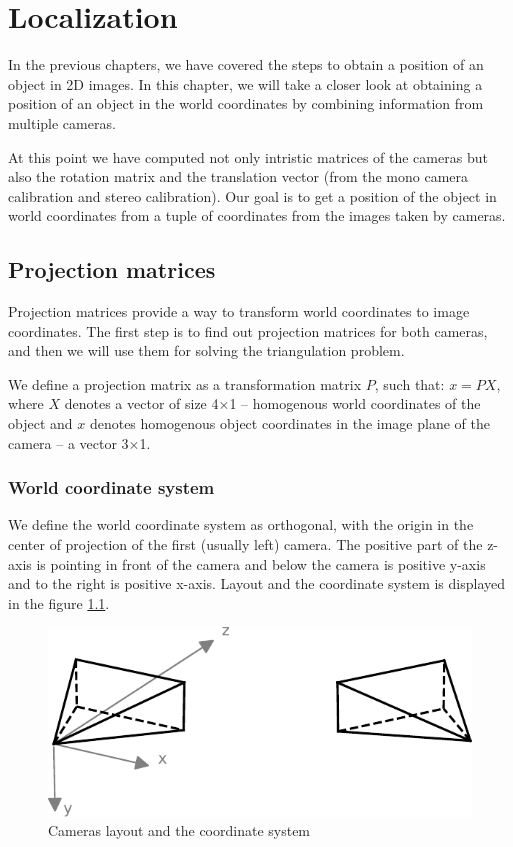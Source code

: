 \chapter{Localization}

In the previous chapters, we have covered the steps to obtain a position of
an object in 2D images. In this chapter, we will take a closer look at
obtaining a position of an object in the world coordinates by combining
information from multiple cameras.

At this point we have computed not only intristic matrices of the cameras but
also the rotation matrix and the translation vector (from the mono camera
calibration and stereo calibration). Our goal is to get a position of the
object in world coordinates from a tuple of coordinates from the images taken by
cameras.

\section{Projection matrices}
Projection matrices provide a way to transform world coordinates to image
coordinates. The first step is to find out projection matrices for both
cameras, and then we will use them for solving the triangulation problem.

We define a projection matrix as a transformation matrix $P$, such that: $x = P
 X$, where $X$ denotes a vector of size 4$\times$1 -- homogenous world coordinates
of the object and $x$ denotes homogenous object coordinates in the image plane
of the camera -- a vector 3$\times$1.

\subsection{World coordinate system}
We define the world coordinate system as orthogonal, with the origin in the
center of projection of the first (usually left) camera. The positive part of
the z-axis is pointing in front of the camera and below the camera is positive
y-axis and to the right is positive x-axis. Layout and the coordinate system is
displayed in the figure \ref{fig:coordinate-system}.

\begin{figure}
\centering
\includegraphics{img/camera-positions}
\caption{Cameras layout and the coordinate system}
\label{fig:coordinate-system}
\end{figure}


